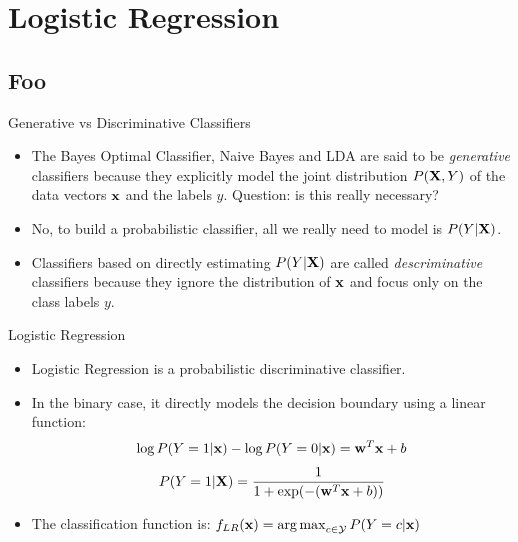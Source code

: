 \documentclass[serif,xcolor=pdftex,dvipsnames,table,hyperref={bookmarks=false}]{beamer}
\begin{document}
\section{Logistic Regression}
\subsection{Foo}

\begin{frame}[t]{Generative vs Discriminative Classifiers}

\begin{itemize}
\setlength{\itemsep}{12pt}
\item The Bayes Optimal Classifier, Naive Bayes and LDA are said to be \textit{generative} classifiers because they explicitly model the joint distribution $P({\mathbf{X}},Y)$ of the data vectors ${\mathbf{x}}$ and the labels $y$. \pause Question: is this really necessary?

\pause\item No, to build a probabilistic classifier, all we really need to model is $P(Y|{\mathbf{X}})$. 

\pause \item Classifiers based on directly estimating $P(Y|{\mathbf{X}})$ are called \textit{descriminative} classifiers because they ignore the distribution of ${\mathbf{x}}$ and focus only on the class labels $y$.

\end{itemize}
\end{frame}

\begin{frame}[t]{Logistic Regression}

\begin{itemize}
\setlength{\itemsep}{8pt}
\item Logistic Regression is a probabilistic discriminative classifier.  

\pause\item In the binary case, it directly models the decision boundary using a linear function:
\pause
$$\log P(Y=1|{\mathbf{x}})-\log P(Y=0|{\mathbf{x}})  = {\mathbf{w}}^T{\mathbf{x}}+b $$%
\pause%
$$P(Y=1|{\mathbf{X}}) = \frac{1}{1+\exp(-({\mathbf{w}}^T{\mathbf{x}}+b))}$$

\pause \item The classification function is: $f_{LR}({\mathbf{x}}) = \operatorname*{arg\,max}_{c\in\mathcal{Y}} P(Y=c|{\mathbf{x}})$

\end{itemize}
\end{frame}
\end{document}
